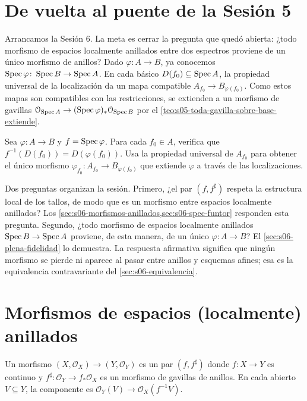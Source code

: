 \section{De vuelta al puente de la Sesión 5}

Arrancamos la Sesión 6. La meta es cerrar la pregunta que quedó abierta: ¿todo morfismo de espacios localmente anillados entre dos espectros proviene de un único morfismo de anillos? Dado $\varphi\colon A\to B$, ya conocemos $\operatorname{Spec}\varphi\colon \operatorname{Spec} B\to\operatorname{Spec} A$. En cada básico $D(f_0)\subseteq\operatorname{Spec} A$, la propiedad universal de la localización da un mapa compatible $A_{f_0}\to B_{\varphi(f_0)}$. Como estos mapas son compatibles con las restricciones, se extienden a un morfismo de gavillas $\mathcal O_{\operatorname{Spec} A}\to (\operatorname{Spec}\varphi)_*\mathcal O_{\operatorname{Spec} B}$ por el \cref{teo:s05-toda-gavilla-sobre-base-extiende}.

\begin{ejer}
\label{ejer:s06-b-f-cada-f-0}
Sea $\varphi\colon A\to B$ y $f=\operatorname{Spec}\varphi$. Para cada $f_0\in A$, verifica que $f^{-1}(D(f_0))=D(\varphi(f_0))$. Usa la propiedad universal de $A_{f_0}$ para obtener el único morfismo $\varphi_{f_0}\colon A_{f_0}\to B_{\varphi(f_0)}$ que extiende $\varphi$ a través de las localizaciones.
\end{ejer}

Dos preguntas organizan la sesión. Primero, ¿el par $(f,f^\sharp)$ respeta la estructura local de los tallos, de modo que es un morfismo entre espacios localmente anillados? Los \cref{sec:s06-morfismos-anillados,sec:s06-spec-funtor} responden esta pregunta. Segundo, ¿todo morfismo de espacios localmente anillados $\operatorname{Spec} B\to\operatorname{Spec} A$ proviene, de esta manera, de un único $\varphi\colon A\to B$? El \cref{sec:s06-plena-fidelidad} lo demuestra. La respuesta afirmativa significa que ningún morfismo se pierde ni aparece al pasar entre anillos y esquemas afines; esa es la equivalencia contravariante del \cref{sec:s06-equivalencia}.

\section{Morfismos de espacios (localmente) anillados}
\label{sec:s06-morfismos-anillados}

\begin{defi}
\label{defi:s06-morfismo-espacios-anillados}
Un morfismo $(X,\mathcal O_X)\to(Y,\mathcal O_Y)$ es un par $(f,f^\sharp)$ donde $f\colon X\to Y$ es continuo y $f^\sharp\colon \mathcal O_Y\to f_*\mathcal O_X$ es un morfismo de gavillas de anillos. En cada abierto $V\subseteq Y$, la componente es $\mathcal O_Y(V)\to\mathcal O_X(f^{-1}V)$.
\end{defi}

